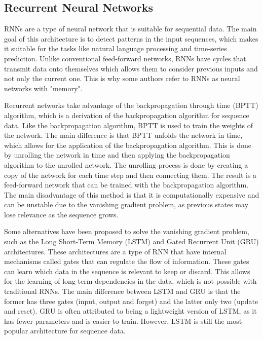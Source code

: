 \subsection{Recurrent Neural Networks}\label{sec:rnn}
RNNs are a type of neural network that is suitable for sequential data. The main goal of this architecture is to detect patterns in the input sequences, which makes it suitable for the tasks like natural language processing and time-series prediction. Unlike conventional feed-forward networks, RNNs have cycles that transmit data onto themselves which allows them to consider previous inputs and not only the current one. This is why some authors refer to RNNs as neural networks with "memory". 

Recurrent networks take advantage of the backpropagation through time (BPTT) algorithm, which is a derivation of the backpropagation algorithm for sequence data. Like the backpropagation algorithm, BPTT is used to train the weights of the network. The main difference is that BPTT unfolds the network in time, which allows for the application of the backpropagation algorithm. This is done by unrolling the network in time and then applying the backpropagation algorithm to the unrolled network. The unrolling process is done by creating a copy of the network for each time step and then connecting them. The result is a feed-forward network that can be trained with the backpropagation algorithm. The main disadvantage of this method is that it is computationally expensive and can be unstable due to the vanishing gradient problem, as previous states may lose relevance as the sequence grows.

Some alternatives have been proposed to solve the vanishing gradient problem, such as the Long Short-Term Memory (LSTM) and Gated Recurrent Unit (GRU) architectures. These architectures are a type of RNN that have internal mechanisms called gates that can regulate the flow of information. These gates can learn which data in the sequence is relevant to keep or discard. This allows for the learning of long-term dependencies in the data, which is not possible with traditional RNNs. The main difference between LSTM and GRU is that the former has three gates (input, output and forget) and the latter only two (update and reset). GRU is often attributed to being a lightweight version of LSTM, as it has fewer parameters and is easier to train. However, LSTM is still the most popular architecture for sequence data.\cite{Schmidt_RecurrentNeuralNetworks_2019}

